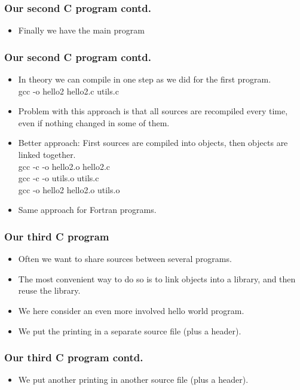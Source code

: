 \documentclass{beamer}
\begin{document}
\begin{frame}\frametitle{Our second C program contd.}
  \begin{itemize}
    \item Finally we have the main program
      
  \end{itemize}
\end{frame}

\begin{frame}\frametitle{Our second C program contd.}
  \begin{itemize}
    \item In theory we can compile in one step as we did for the first program. \\
      gcc -o hello2 hello2.c utils.c
    \item Problem with this approach is that all sources are recompiled every time, even
          if nothing changed in some of them.
    \item Better approach: First sources are compiled into objects, then objects are linked together. \\
      gcc -c -o hello2.o hello2.c \\
      gcc -c -o utils.o utils.c \\
      gcc -o hello2 hello2.o utils.o
    \item Same approach for Fortran programs.
  \end{itemize}
\end{frame}

\begin{frame}\frametitle{Our third C program}
  \begin{itemize}
    \item Often we want to share sources between several programs.
    \item The most convenient way to do so is to link objects into a library, and then reuse the library.
    \item We here consider an even more involved hello world program.
    \item We put the printing in a separate source file (plus a header).
      
  \end{itemize}
\end{frame}

\begin{frame}\frametitle{Our third C program contd.}
  \begin{itemize}
    \item We put another printing in another source file (plus a header).
      
  \end{itemize}
\end{frame}
\end{document}
